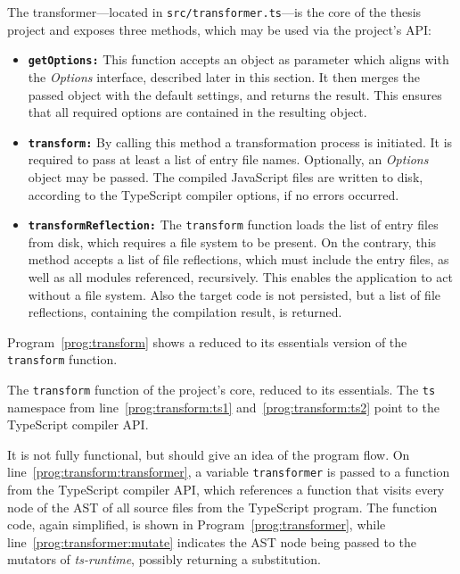 The transformer---located in \texttt{src/transformer.ts}---is the core of the thesis project and exposes three methods, which may be used via the project's API:
\begin{itemize}
  \item \texttt{\textbf{getOptions:}} This function accepts an object as parameter which aligns with the \emph{Options} interface, described later in this section. It then merges the passed object with the default settings, and returns the result. This ensures that all required options are contained in the resulting object.
  \item \texttt{\textbf{transform:}} By calling this method a transformation process is initiated. It is required to pass at least a list of entry file names. Optionally, an \emph{Options} object may be passed. The compiled JavaScript files are written to disk, according to the TypeScript compiler options, if no errors occurred.
  \item \texttt{\textbf{transformReflection:}} The \texttt{transform} function loads the list of entry files from disk, which requires a file system to be present. On the contrary, this method accepts a list of file reflections, which must include the entry files, as well as all modules referenced, recursively. This enables the application to act without a file system. Also the target code is not persisted, but a list of file reflections, containing the compilation result, is returned.
\end{itemize}
Program~\ref{prog:transform} shows a reduced to its essentials version of the \texttt{transform} function.
\begin{program}
\caption{The \texttt{transform} function of the project's core, reduced to its essentials. The \texttt{ts} namespace from line~\ref{prog:transform:ts1} and~\ref{prog:transform:ts2} point to the TypeScript compiler API.}
\label{prog:transform}
\begin{JsCode}
function transform(entryFiles: string[], options?: Options} {
  const opts = getOptions(options);
  const program = ts.createProgram(entryFiles, opts.compilerOptions); /+\label{prog:transform:ts1}+/
  const scanner = new Scanner(program, opts);
  const files = program.getSourceFiles();
  const result = ts.transform(files, [transformer], opts.compilerOptions); /+\label{prog:transform:ts2}+/ /+\label{prog:transform:transformer}+/
  emit(result);
}
\end{JsCode}
\end{program}
It is not fully functional, but should give an idea of the program flow. On line~\ref{prog:transform:transformer}, a variable \texttt{transformer} is passed to a function from the TypeScript compiler API, which references a function that visits every node of the AST of all source files from the TypeScript program. The function code, again simplified, is shown in Program~\ref{prog:transformer}, while line~\ref{prog:transformer:mutate} indicates the AST node being passed to the mutators of \emph{ts-runtime}, possibly returning a substitution.

